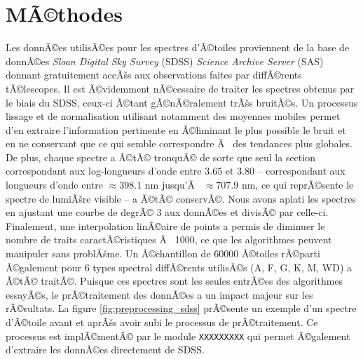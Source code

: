 \documentclass{article}
\begin{document}
\section{MÃ©thodes}\label{sec:methods}

Les donnÃ©es utilisÃ©es pour les spectres d'Ã©toiles proviennent de la base de donnÃ©es \textit{Sloan Digital Sky Survey} (SDSS) \textit{Science Archive Server} (SAS) donnant gratuitement accÃšs aux observations faites par diffÃ©rents tÃ©lescopes. Il est Ã©videmment nÃ©cessaire de traiter les spectres obtenus par le biais du SDSS, ceux-ci Ã©tant gÃ©nÃ©ralement trÃšs bruitÃ©s. Un processus lissage et de normalisation utilisant notamment des moyennes mobiles permet d'en extraire l'information pertinente en Ã©liminant le plus possible le bruit et en ne conservant que ce qui semble correspondre Ã  des tendances plus globales. De plus, chaque spectre a Ã©tÃ© tronquÃ© de sorte que seul la section correspondant aux log-longueurs d'onde entre $3.65$ et $3.80$ -- correspondant aux longueurs d'onde entre $\approx 398.1$ nm jusqu'Ã  $\approx 707.9$ nm, ce qui reprÃ©sente le spectre de lumiÃšre visible -- a Ã©tÃ© conservÃ©. Nous avons aplati les spectres en ajustant une courbe de degrÃ© 3 aux donnÃ©es et divisÃ© par celle-ci. Finalement, une interpolation linÃ©aire de points a permis de diminuer le nombre de traits caractÃ©ristiques Ã  1000, ce que les algorithmes peuvent manipuler sans problÃšme. Un Ã©chantillon de 60000 Ã©toiles rÃ©parti Ã©galement pour 6 types spectral diffÃ©rents utilisÃ©s (A, F, G, K, M, WD) a Ã©tÃ© traitÃ©. Puisque ces spectres sont les seules entrÃ©es des algorithmes essayÃ©s, le prÃ©traitement des donnÃ©es a un impact majeur sur les rÃ©sultats. La figure \ref{fig:preprocessing_sdss} prÃ©sente un exemple d'un spectre d'Ã©toile avant et aprÃšs avoir subi le processus de prÃ©traitement. Ce processus est implÃ©mentÃ© par le module \texttt{XXXXXXXXX} qui permet Ã©galement d'extraire les donnÃ©es directement de SDSS.
\end{document}
